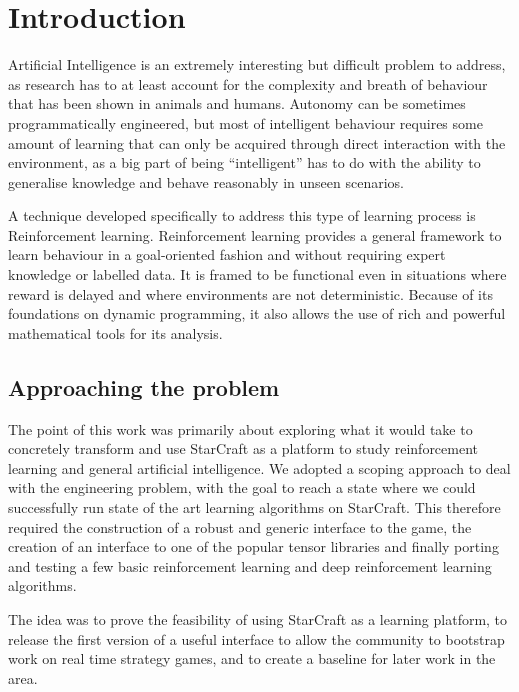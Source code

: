 
\chapter{Introduction}

Artificial Intelligence is an extremely interesting but difficult problem to
address, as research has to at least account for the complexity and breath of
behaviour that has been shown in animals and humans. Autonomy can be sometimes
programmatically engineered, but most of intelligent behaviour requires some
amount of learning that can only be acquired through direct interaction with the
environment, as a big part of being ``intelligent'' has to do with the ability
to generalise knowledge and behave reasonably in unseen scenarios.

A technique developed specifically to address this type of learning process is
Reinforcement learning. Reinforcement learning provides a general framework
to learn behaviour in a goal-oriented fashion and without requiring expert
knowledge or labelled data. It is framed to be functional even in situations
where reward is delayed and where environments are not deterministic. Because of
its foundations on dynamic programming, it also allows the use of rich and
powerful mathematical tools for its analysis.

\section{Approaching the problem} %

The point of this work was primarily about exploring what it would take to
concretely transform and use StarCraft as a platform to study reinforcement
learning and general artificial intelligence. We adopted a scoping approach to
deal with the engineering problem, with the goal to reach a state where we could
successfully run state of the art learning algorithms on StarCraft. This
therefore required the construction of a robust and generic interface to the
game, the creation of an interface to one of the popular tensor libraries and
finally porting and testing a few basic reinforcement learning and deep
reinforcement learning algorithms.

The idea was to prove the feasibility of using StarCraft as a learning platform,
to release the first version of a useful interface to allow the community to
bootstrap work on real time strategy games, and to create a baseline for later
work in the area.

